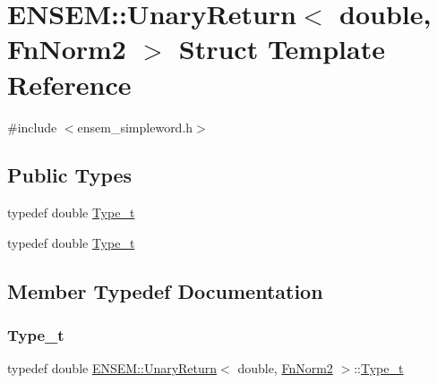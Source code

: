 \hypertarget{structENSEM_1_1UnaryReturn_3_01double_00_01FnNorm2_01_4}{}\section{E\+N\+S\+EM\+:\+:Unary\+Return$<$ double, Fn\+Norm2 $>$ Struct Template Reference}
\label{structENSEM_1_1UnaryReturn_3_01double_00_01FnNorm2_01_4}


{\ttfamily \#include $<$ensem\+\_\+simpleword.\+h$>$}

\subsection*{Public Types}
\begin{DoxyCompactItemize}
\item 
typedef double \mbox{\hyperlink{structENSEM_1_1UnaryReturn_3_01double_00_01FnNorm2_01_4_aedc7475de7c195d2c7597fbf10405b87}{Type\+\_\+t}}
\item 
typedef double \mbox{\hyperlink{structENSEM_1_1UnaryReturn_3_01double_00_01FnNorm2_01_4_aedc7475de7c195d2c7597fbf10405b87}{Type\+\_\+t}}
\end{DoxyCompactItemize}


\subsection{Member Typedef Documentation}
\mbox{\label{structENSEM_1_1UnaryReturn_3_01double_00_01FnNorm2_01_4_aedc7475de7c195d2c7597fbf10405b87}} 
\subsubsection{\texorpdfstring{Type\_t}{Type\_t}\hspace{0.1cm}{\footnotesize\ttfamily [1/2]}}
{\footnotesize\ttfamily typedef double \mbox{\hyperlink{structENSEM_1_1UnaryReturn}{E\+N\+S\+E\+M\+::\+Unary\+Return}}$<$ double, \mbox{\hyperlink{structENSEM_1_1FnNorm2}{Fn\+Norm2}} $>$\+::\mbox{\hyperlink{structENSEM_1_1UnaryReturn_3_01double_00_01FnNorm2_01_4_aedc7475de7c195d2c7597fbf10405b87}{Type\+\_\+t}}}

